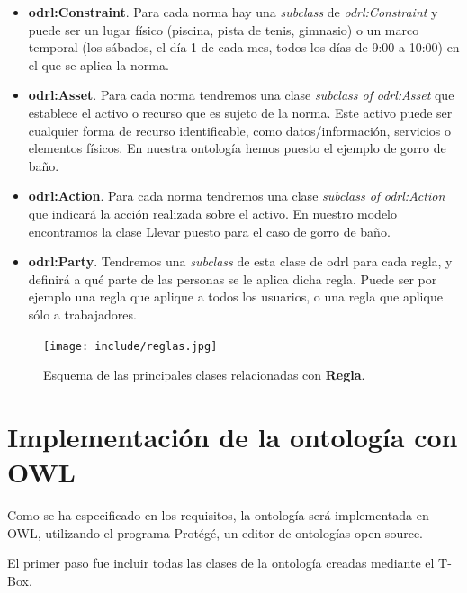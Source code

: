 \documentclass[a4paper,12pt]{article}
\begin{document}
	\begin{itemize}
		\item \textbf{odrl:Constraint}. Para cada norma hay una \textit{subclass} de \textit{odrl:Constraint} y puede ser un lugar físico (piscina, pista de tenis, gimnasio) o un marco temporal (los sábados, el día 1 de cada mes, todos los días de 9:00 a 10:00) en el que se aplica la norma.
		\item \textbf{odrl:Asset}. Para cada norma tendremos una clase \textit{subclass of} \textit{odrl:Asset} que establece el activo o recurso que es sujeto de la norma. Este activo puede ser cualquier forma de recurso identificable, como datos/información, servicios o elementos físicos. En nuestra ontología hemos puesto el ejemplo de gorro de baño.
		\item \textbf{odrl:Action}. Para cada norma tendremos una clase \textit{subclass of} \textit{odrl:Action} que indicará la acción realizada sobre el activo. En nuestro modelo encontramos la clase Llevar puesto para el caso de gorro de baño.
		\item \textbf{odrl:Party}. Tendremos una \textit{subclass} de esta clase de odrl para cada regla, y definirá a qué parte de las personas se le aplica dicha regla. Puede ser por ejemplo una regla que aplique a todos los usuarios, o una regla que aplique sólo a trabajadores.
	\end{itemize}
	
	\begin{figure}[H]
		\centering
		\texttt{[image: include/reglas.jpg]}
		\caption{Esquema de las principales clases relacionadas con \textbf{Regla}.}
	\end{figure}
	
	\section{Implementación de la ontología con OWL}
	
	Como se ha especificado en los requisitos, la ontología será implementada en OWL, utilizando el programa Protégé, un editor de ontologías open source.
	
	El primer paso fue incluir todas las clases de la ontología creadas mediante el T-Box.
	
\end{document}
